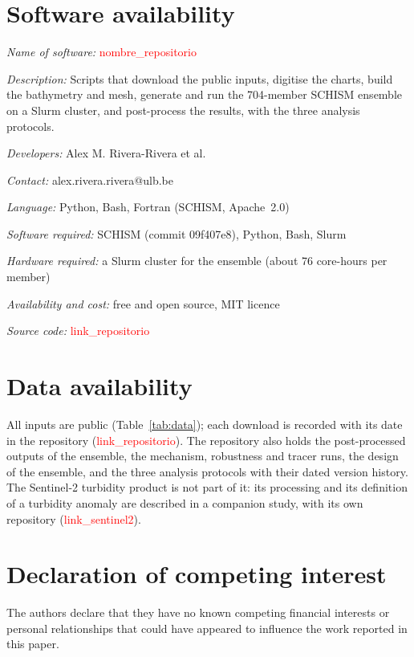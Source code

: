 \documentclass[a4paper,fleqn]{ems-dc}
\newcommand{\ph}[1]{\textcolor{red}{\textsf{#1}}}
\begin{document}
\section*{Software availability}
\noindent\textit{Name of software:} \ph{nombre\_repositorio}\par
\noindent\textit{Description:} Scripts that download the public inputs, digitise the
charts, build the bathymetry and mesh, generate and run the 704-member SCHISM ensemble on
a Slurm cluster, and post-process the results, with the three analysis protocols.\par
\noindent\textit{Developers:} Alex M. Rivera-Rivera et al.\par
\noindent\textit{Contact:} alex.rivera.rivera@ulb.be\par
\noindent\textit{Language:} Python, Bash, Fortran (SCHISM, Apache~2.0)\par
\noindent\textit{Software required:} SCHISM (commit 09f407e8), Python, Bash, Slurm\par
\noindent\textit{Hardware required:} a Slurm cluster for the ensemble (about 76 core-hours
per member)\par
\noindent\textit{Availability and cost:} free and open source, MIT licence\par
\noindent\textit{Source code:} \ph{link\_repositorio}

\section*{Data availability}
All inputs are public (Table~\ref{tab:data}); each download is recorded with its date in
the repository (\ph{link\_repositorio}). The repository also holds the post-processed
outputs of the ensemble, the mechanism, robustness and tracer runs, the design of the
ensemble, and the three analysis protocols with their dated version history. The Sentinel-2
turbidity product is not part of it: its processing and its definition of a turbidity
anomaly are described in a companion study, with its own repository (\ph{link\_sentinel2}).

\section*{Declaration of competing interest}
The authors declare that they have no known competing financial interests or personal
relationships that could have appeared to influence the work reported in this paper.
\end{document}
